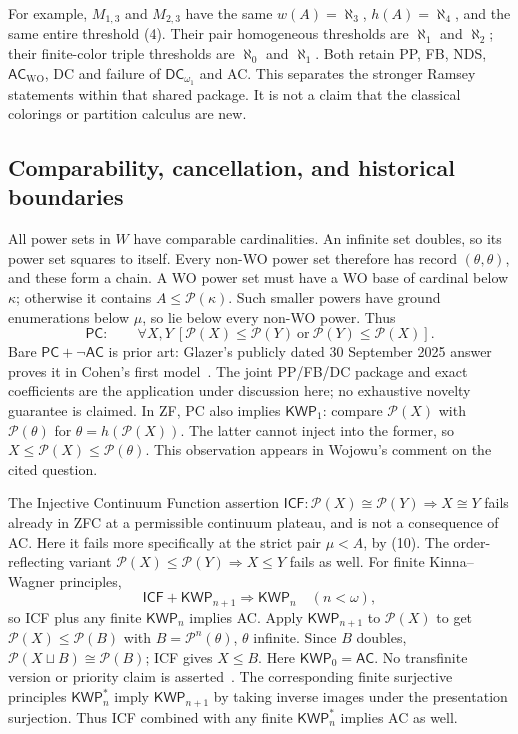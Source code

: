 For example, $M_{1,3}$ and $M_{2,3}$ have the same
$w(A)=\aleph_3$, $h(A)=\aleph_4$, and the same entire threshold (4).
Their pair homogeneous thresholds are $\aleph_1$ and $\aleph_2$;
their finite-color triple thresholds are $\aleph_0$ and $\aleph_1$.
Both retain PP, FB, NDS, $\mathsf{AC}_{\mathrm{WO}}$, DC and failure of
$\mathsf{DC}_{\omega_1}$ and AC. This separates the stronger Ramsey
statements within that shared package. It is not a claim that the
classical colorings or partition calculus are new.

\subsection{Comparability, cancellation, and historical boundaries}

All power sets in $W$ have comparable cardinalities. An infinite set
doubles, so its power set squares to itself. Every non-WO power set
therefore has record $(\theta,\theta)$, and these form a chain. A WO
power set must have a WO base of cardinal below $\kappa$; otherwise it
contains $A\leq\mathcal P(\kappa)$. Such smaller powers have ground
enumerations below $\mu$, so lie below every non-WO power. Thus
\[
 \mathsf{PC}:\qquad
  \forall X,Y\ [\mathcal P(X)\leq\mathcal P(Y)
                  \ \text{or}\ \mathcal P(Y)\leq\mathcal P(X)]. \tag{17}
\]
Bare $\mathsf{PC}+\neg\mathsf{AC}$ is prior art: Glazer's publicly dated
30 September 2025 answer proves it in Cohen's first model~\cite{Glazer}.
The joint PP/FB/DC package and exact coefficients are the application
under discussion here; no exhaustive novelty guarantee is claimed.
In ZF, PC also implies $\mathsf{KWP}_1$: compare $\mathcal P(X)$
with $\mathcal P(\theta)$ for $\theta=h(\mathcal P(X))$. The latter
cannot inject into the former, so $X\leq\mathcal P(X)\leq\mathcal P(\theta)$.
This observation appears in Wojowu's comment on the cited question.

The Injective Continuum Function assertion
$\mathsf{ICF}:\mathcal P(X)\cong\mathcal P(Y)\Rightarrow X\cong Y$
fails already in ZFC at a permissible continuum plateau, and is not a
consequence of AC. Here it fails more specifically at the strict pair
$\mu<A$, by (10). The order-reflecting variant
$\mathcal P(X)\leq\mathcal P(Y)\Rightarrow X\leq Y$ fails as well.
For finite Kinna--Wagner principles,
\[
          \mathsf{ICF}+\mathsf{KWP}_{n+1}
                           \Rightarrow\mathsf{KWP}_{n}\quad(n<\omega),
                                                                  \tag{18}
\]
so ICF plus any finite $\mathsf{KWP}_n$ implies AC.
Apply $\mathsf{KWP}_{n+1}$ to $\mathcal P(X)$ to get
$\mathcal P(X)\leq\mathcal P(B)$ with $B=\mathcal P^n(\theta)$,
$\theta$ infinite. Since $B$ doubles,
$\mathcal P(X\sqcup B)\cong\mathcal P(B)$; ICF gives $X\leq B$.
Here $\mathsf{KWP}_0=\mathsf{AC}$. No transfinite version or priority
claim is asserted~\cite{KS,ICFquestion}. The corresponding finite
surjective principles $\mathsf{KWP}^{*}_n$ imply $\mathsf{KWP}_{n+1}$
by taking inverse images under the presentation surjection. Thus ICF
combined with any finite $\mathsf{KWP}^{*}_n$ implies AC as well.

